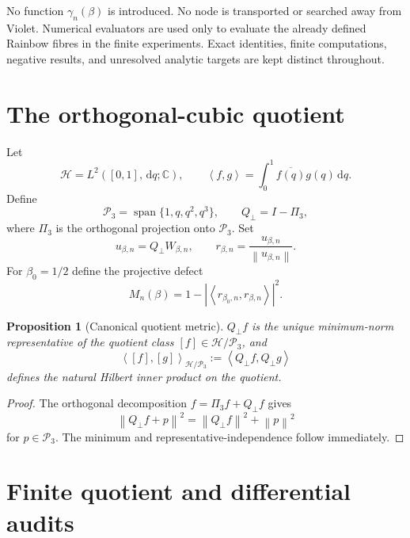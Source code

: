 \documentclass[11pt]{amsart}
\numberwithin{equation}{section}
\theoremstyle{plain}
\newtheorem{proposition}[theorem]{Proposition}
\theoremstyle{definition}
\theoremstyle{remark}
\newcommand{\C}{\mathbb C}
\newcommand{\Hcal}{\mathcal H}
\newcommand{\Pcal}{\mathcal P}
\newcommand{\dd}{\,\mathrm d}
\newcommand{\ip}[2]{\left\langle #1,#2\right\rangle}
\newcommand{\norm}[1]{\left\lVert #1\right\rVert}
\begin{document}
No function $\gamma_n(\beta)$ is introduced.  No node is transported or searched away from Violet.  Numerical evaluators are used only to evaluate the already defined Rainbow fibres in the finite experiments.  Exact identities, finite computations, negative results, and unresolved analytic targets are kept distinct throughout.

\section{The orthogonal-cubic quotient}
\label{sec:quotient}

Let
\begin{equation}
\Hcal=L^2([0,1],\dd q;\C),
\qquad
\ip{f}{g}=\int_0^1\overline{f(q)}g(q)\dd q.
\end{equation}
Define
\begin{equation}
\Pcal_3=\operatorname{span}\{1,q,q^2,q^3\},
\qquad
Q_\perp=I-\Pi_3,
\label{eq:Qperp}
\end{equation}
where $\Pi_3$ is the orthogonal projection onto $\Pcal_3$.  Set
\begin{equation}
u_{\beta,n}=Q_\perp W_{\beta,n},
\qquad
r_{\beta,n}=\frac{u_{\beta,n}}{\norm{u_{\beta,n}}}.
\label{eq:u-r}
\end{equation}
For $\beta_0=1/2$ define the projective defect
\begin{equation}
\boxed{
M_n(\beta)=1-\left|\ip{r_{\beta_0,n}}{r_{\beta,n}}\right|^2.
}
\label{eq:M}
\end{equation}

\begin{proposition}[Canonical quotient metric]
\label{prop:quotient}
$Q_\perp f$ is the unique minimum-norm representative of the quotient class $[f]\in\Hcal/\Pcal_3$, and
\begin{equation}
\ip{[f]}{[g]}_{\Hcal/\Pcal_3}
:=\ip{Q_\perp f}{Q_\perp g}
\end{equation}
defines the natural Hilbert inner product on the quotient.
\end{proposition}

\begin{proof}
The orthogonal decomposition $f=\Pi_3f+Q_\perp f$ gives
\begin{equation}
\norm{Q_\perp f+p}^2=\norm{Q_\perp f}^2+\norm{p}^2
\end{equation}
for $p\in\Pcal_3$.  The minimum and representative-independence follow immediately.
\end{proof}

\section{Finite quotient and differential audits}
\label{sec:numerics}
\end{document}
